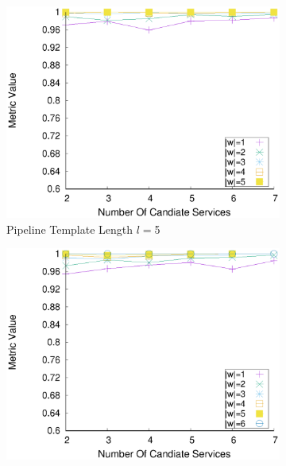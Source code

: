 \begin{figure}[ht!]
\begin{subfigure}{0.49\textwidth}
        \label{fig:quality_window_average_qualitative_n4}
      \end{subfigure}
      \hfill
      \begin{subfigure}{0.49\textwidth}
        \includegraphics[width=\textwidth]{Images/graphs/window_quality_performance_diff_qual_n7_s7_50_80_n5}
        \caption{Pipeline Template Length $l$$=$5}
        \label{fig:quality_window_average_qualitative_n5}
      \end{subfigure}
      \hfill
      \begin{subfigure}{0.49\textwidth}
        \includegraphics[width=\textwidth]{Images/graphs/window_quality_performance_diff_qual_n7_s7_50_80_n6}

\end{subfigure}
\end{figure}
